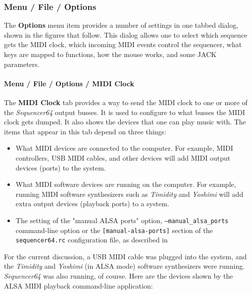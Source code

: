 \subsubsection{Menu / File / Options}
\label{subsubsec:seq64_menu_file_options}

   The \textbf{Options} menu item provides a number of settings in one
   tabbed dialog, shown in the figures that follow.
   This dialog allows one to select which sequence gets the MIDI
   clock, which incoming MIDI events control the sequencer, what keys are
   mapped to functions, how the mouse works, and some JACK parameters.

\paragraph{Menu / File / Options / MIDI Clock}
\label{paragraph:seq64_menu_file_options_midi_clock}

   The \textbf{MIDI Clock} tab provides a way to send the MIDI clock to one
   or more of the \textsl{Sequencer64} output busses.
   It is used to configure to what busses the MIDI clock gets dumped.
   It also shows the devices that one can play music with.
   The items that appear in this tab depend on three things:

   \begin{itemize}
      \item What MIDI devices are connected to the computer.  For example,
         MIDI controllers, USB MIDI cables, and other devices will add MIDI
         output devices (ports) to the system.
      \item What MIDI software devices are running on the computer.
         For example, running MIDI software synthesizers such as
         \textsl{Timidity} and \textsl{Yoshimi} will add extra output devices
         (playback ports) to a system.
      \item The setting of the "manual ALSA ports" option,
         \texttt{--manual\_alsa\_ports} command-line option or the
         \texttt{[manual-alsa-ports]} section of the
         \texttt{sequencer64.rc} configuration file, as described in
   \end{itemize}

   For the current discussion, a USB MIDI cable was plugged into the system,
   and the \textsl{Timidity} and \textsl{Yoshimi} (in ALSA mode) software
   synthesizers were running.  \textsl{Sequencer64} was also running, of
   course.  Here are the devices shown by the ALSA MIDI playback
   command-line application:


